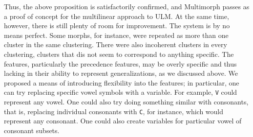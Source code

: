 Thus, the above proposition is satisfactorily confirmed, and Multimorph passes as a proof of concept for the multilinear approach to ULM.
At the same time, however, there is still plenty of room for improvement. The system is by no means perfect. Some morphs, for instance, were repeated as more than one cluster in the same clustering. There were also incoherent clusters in every clustering, clusters that dis not seem to correspond to anything specific.
The features, particularly the precedence features, may be overly specific and thus lacking in their ability to represent generalizations, as we discussed above. We proposed a means of introducing flexibility into the features; in particular, one can try replacing specific vowel symbols with a variable. For example, \texttt{V} could represent any vowel. One could also try doing something similar with consonants, that is, replacing individual consonants with \texttt{C}, for instance, which would represent any consonant. One could also create variables for particular vowel of consonant subsets. %



%


